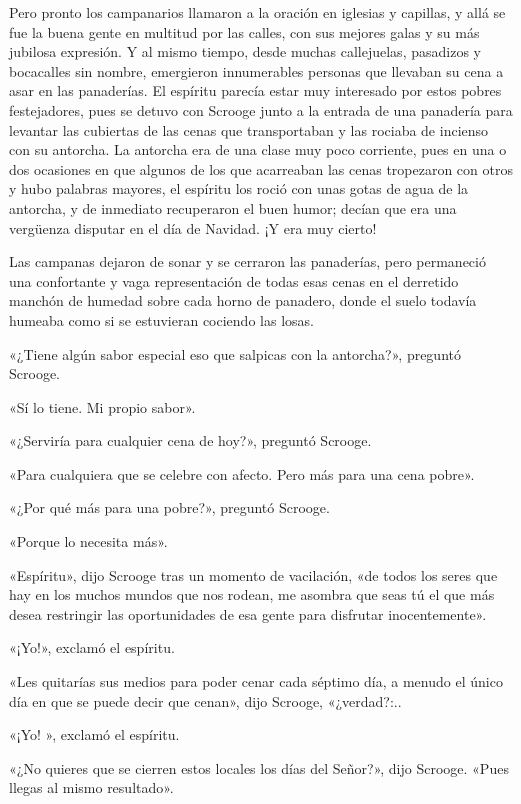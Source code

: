 \documentclass{novela}
\begin{document}
 Pero pronto los campanarios llamaron a la oración en iglesias y capillas, y allá se fue la buena gente en multitud por las calles, con sus mejores galas y su más jubilosa expresión. Y al mismo tiempo, desde muchas callejuelas, pasadizos y bocacalles sin nombre, emergieron innumerables personas que llevaban su cena a asar en las panaderías. El espíritu parecía estar muy interesado por estos pobres festejadores, pues se detuvo con Scrooge junto a la entrada de una panadería para levantar las cubiertas de las cenas que transportaban y las rociaba de incienso con su antorcha. La antorcha era de una clase muy poco corriente, pues en una o dos ocasiones en que algunos de los que acarreaban las cenas tropezaron con otros y hubo palabras mayores, el espíritu los roció con unas gotas de agua de la antorcha, y de inmediato recuperaron el buen humor; decían que era una vergüenza disputar en el día de Navidad. ¡Y era muy cierto!

 Las campanas dejaron de sonar y se cerraron las panaderías, pero permaneció una confortante y vaga representación de todas esas cenas en el derretido manchón de humedad sobre cada horno de panadero, donde el suelo todavía humeaba como si se estuvieran cociendo las losas.

 «¿Tiene algún sabor especial eso que salpicas con la antorcha?», preguntó Scrooge.

 «Sí lo tiene. Mi propio sabor».

 «¿Serviría para cualquier cena de hoy?», preguntó Scrooge.

 «Para cualquiera que se celebre con afecto. Pero más para una cena pobre».

 «¿Por qué más para una pobre?», preguntó Scrooge.

 «Porque lo necesita más».

 «Espíritu», dijo Scrooge tras un momento de vacilación, «de todos los seres que hay en los muchos mundos que nos rodean, me asombra que seas tú el que más desea restringir las oportunidades de esa gente para disfrutar inocentemente».

 «¡Yo!», exclamó el espíritu.

 «Les quitarías sus medios para poder cenar cada séptimo día, a menudo el único día en que se puede decir que cenan», dijo Scrooge, «¿verdad?:..

 «¡Yo! », exclamó el espíritu.

 «¿No quieres que se cierren estos locales los días del Señor?», dijo Scrooge. «Pues llegas al mismo resultado».
\end{document}
